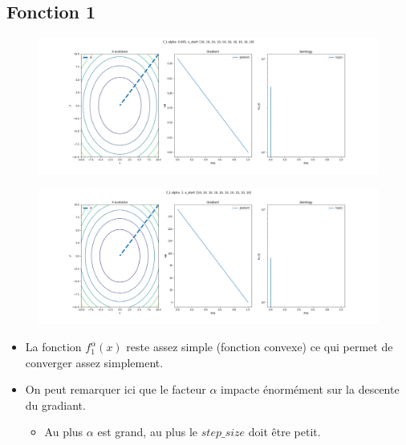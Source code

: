 \documentclass[twoside,10pt,a4paper]{article}
\numberwithin{equation}{section}					%
\numberwithin{figure}{section}						%
\begin{document}
\subsection{Fonction 1 }\label{sec:subsection2}
\begin{figure}[H]
    \centering
    \includegraphics[width=\textwidth]{imgs/newton/f_1_a-0.005_newton.png}
    \caption{}
\end{figure}
\begin{figure}[H]
    \centering
    \includegraphics[width=\textwidth]{imgs/newton/f_1_a-3_newton.png}
    \caption{}
\end{figure}
\begin{itemize}
	\item La fonction $f_1^{\alpha}(x)$ reste assez simple (fonction convexe) ce qui permet de converger assez simplement.
	\item On peut remarquer ici que le facteur $\alpha$ impacte énormément sur la descente du gradiant.
	\begin{itemize}
    	\item Au plus $\alpha$ est grand, au plus le $step\_size$ doit être petit.
	\end{itemize}
\end{itemize}
\end{document}
